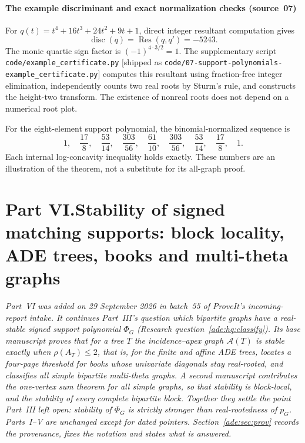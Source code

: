 \documentclass[11pt]{article}
\numberwithin{equation}{section}
\theoremstyle{definition}
\newcommand{\calA}{\mathcal A}
\begin{document}
\subsection{The example discriminant and exact normalization checks (source~07)}
\label{lor:sp:app:certificate}
For $q(t)=t^4+16t^3+24t^2+9t+1$, direct integer resultant computation gives
\[
 \operatorname{disc}(q)=\operatorname{Res}(q,q')=-5243.
\]
The monic quartic sign factor is $(-1)^{4\cdot3/2}=1$.
The supplementary script \nolinkurl{code/example_certificate.py} [shipped as
\nolinkurl{code/07-support-polynomials-example_certificate.py}] computes this
resultant using fraction-free integer elimination, independently counts two real
roots by Sturm's rule, and constructs the height-two transform. The existence
of nonreal roots does not depend on a numerical root plot.

For the eight-element support polynomial, the binomial-normalized sequence is
\[
 1,\quad \frac{17}{8},\quad \frac{53}{14},\quad
 \frac{303}{56},\quad \frac{61}{10},\quad
 \frac{303}{56},\quad\frac{53}{14},\quad\frac{17}{8},\quad1.
\]
Each internal log-concavity inequality holds exactly. These numbers are an
illustration of the theorem, not a substitute for its all-graph proof.

\clearpage
{}\part*{Part VI.\quad Stability of signed matching supports: block locality, ADE trees, books and multi-theta graphs}

\noindent\emph{Part~VI was added on 29 September 2026 in batch~55 of
ProveIt's incoming-report intake. It continues Part~III's question which
bipartite graphs have a real-stable signed support polynomial $\Phi_G$
(Research question~\ref{ade:hq:classify}). Its base manuscript proves that
for a tree $T$ the incidence--apex graph $\calA(T)$ is stable exactly when
$\rho(A_T)\le2$, that is, for the finite and affine ADE trees, locates a
four-page threshold for books whose univariate diagonals stay real-rooted,
and classifies all simple bipartite multi-theta graphs. A second manuscript
contributes the one-vertex sum theorem for all simple graphs, so that
stability is block-local, and the stability of every complete bipartite
block. Together they settle the point Part~III left open: stability of
$\Phi_G$ is strictly stronger than real-rootedness of $p_G$. Parts~I--V are
unchanged except for dated pointers.
Section~\ref{ade:sec:prov} records the provenance, fixes the notation and
states what is answered.}
\end{document}
